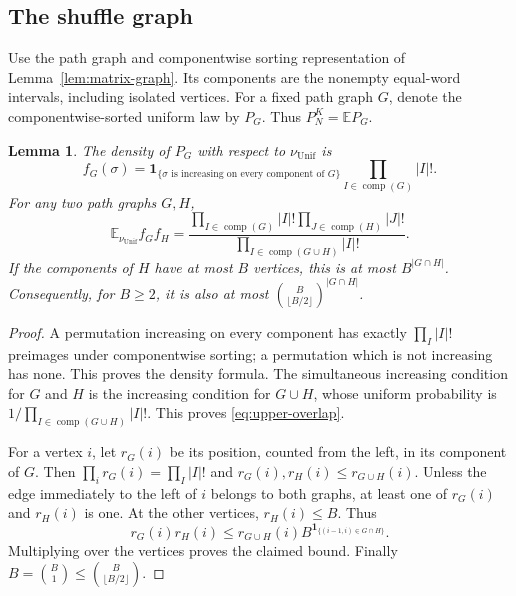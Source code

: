 \documentclass[11pt]{article}
\numberwithin{equation}{section}
\newtheorem{lemma}[theorem]{Lemma}
\theoremstyle{definition}
\theoremstyle{remark}
\newcommand{\E}{\mathbb E}
\newcommand{\Unif}{\mathrm{Unif}}
\newcommand{\nuUnif}{\nu_{\Unif}}
\newcommand{\1}{\mathbf 1}
\begin{document}
\subsection{The shuffle graph}
Use the path graph and componentwise sorting representation of
Lemma~\ref{lem:matrix-graph}. Its components are the nonempty
equal-word intervals, including isolated vertices. For a fixed path
graph $G$, denote the componentwise-sorted uniform law by $P_G$.
Thus $P_N^K=\E P_G$.

\begin{lemma}%
\label{lem:upper-overlap}
The density of $P_G$ with respect to $\nuUnif$ is
\[
 f_G(\sigma)=\mathbf1_{\{\sigma\text{ is increasing on every component of }G\}}
                   \prod_{I\in\operatorname{comp}(G)}|I|!.
\]
For any two path graphs $G,H$,
\begin{equation}\label{eq:upper-overlap}
 \E_{\nuUnif}f_G f_H
 =\frac{\displaystyle\prod_{I\in\operatorname{comp}(G)}|I|!
                    \prod_{J\in\operatorname{comp}(H)}|J|!}
          {\displaystyle\prod_{I\in\operatorname{comp}(G\cup H)}|I|!}.
\end{equation}
If the components of $H$ have at most $B$ vertices, this is at most
$B^{|G\cap H|}$. Consequently, for $B\ge2$, it is also at most
$\binom B{\lfloor B/2\rfloor}^{|G\cap H|}$.
\end{lemma}
\begin{proof}
A permutation increasing on every component has exactly
$\prod_I|I|!$ preimages under componentwise sorting; a permutation
which is not increasing has none. This proves the density formula.
The simultaneous increasing condition for $G$ and $H$ is the increasing
condition for $G\cup H$, whose uniform probability is
$1/\prod_{I\in\operatorname{comp}(G\cup H)}|I|!$. This proves
\eqref{eq:upper-overlap}.

For a vertex $i$, let $r_G(i)$ be its position, counted from the left,
in its component of $G$. Then $\prod_i r_G(i)=\prod_I|I|!$ and
$r_G(i),r_H(i)\le r_{G\cup H}(i)$. Unless the edge immediately to
the left of $i$ belongs to both graphs, at least one of $r_G(i)$ and
$r_H(i)$ is one. At the other vertices, $r_H(i)\le B$. Thus
\[
 r_G(i)r_H(i)\le r_{G\cup H}(i)
       B^{\mathbf1_{\{(i-1,i)\in G\cap H\}}}.
\]
Multiplying over the vertices proves the claimed bound. Finally
$B=\binom B1\le\binom B{\lfloor B/2\rfloor}$.
\end{proof}
\end{document}
